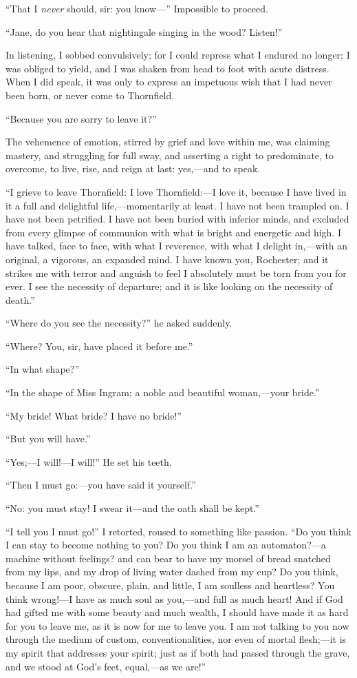 \enquote{That I \emph{never} should, sir: you know---} Impossible to proceed.

\enquote{Jane, do you hear that nightingale singing in the wood?
	Listen!}

In listening, I sobbed convulsively; for I could repress what I endured
no longer; I was obliged to yield, and I was shaken from head to foot
with acute distress. When I did speak, it was only to express an
impetuous wish that I had never been born, or never come to Thornfield.

\enquote{Because you are sorry to leave it?}

The vehemence of emotion, stirred by grief and love within me, was
claiming mastery, and struggling for full sway, and asserting a right to
predominate, to overcome, to live, rise, and reign at last: yes,---and
to speak.

\enquote{I grieve to leave Thornfield: I love Thornfield:---I love it,
	because I have lived in it a full and delightful life,---momentarily at
	least. I have not been trampled on. I have not been petrified. I have
	not been buried with inferior minds, and excluded from every glimpse of
	communion with what is bright and energetic and high. I have talked,
	face to face, with what I reverence, with what I delight in,---with an
	original, a vigorous, an expanded mind. I have known you, \Mr{}
	Rochester; and it strikes me with terror and anguish to feel I
	absolutely must be torn from you for ever. I see the necessity of
	departure; and it is like looking on the necessity of death.}

\enquote{Where do you see the necessity?} he asked suddenly.

\enquote{Where? You, sir, have placed it before me.}

\enquote{In what shape?}

\enquote{In the shape of Miss Ingram; a noble and beautiful
	woman,---your bride.}

\enquote{My bride! What bride? I have no bride!}

\enquote{But you will have.}

\enquote{Yes;---I will!---I will!} He set his teeth.

\enquote{Then I must go:---you have said it yourself.}

\enquote{No: you must stay! I swear it---and the oath shall be kept.}

\enquote{I tell you I must go!} I retorted, roused to something like
passion. \enquote{Do you think I can stay to become nothing to you? Do
	you think I am an automaton?---a machine without feelings? and can bear
	to have my morsel of bread snatched from my lips, and my drop of living
	water dashed from my cup? Do you think, because I am poor, obscure,
	plain, and little, I am soulless and heartless? You think wrong!---I
	have as much soul as you,---and full as much heart! And if God had
	gifted me with some beauty and much wealth, I should have made it as
	hard for you to leave me, as it is now for me to leave you. I am not
	talking to you now through the medium of custom, conventionalities, nor
	even of mortal flesh;---it is my spirit that addresses your spirit; just
	as if both had passed through the grave, and we stood at God's feet,
	equal,---as we are!}

